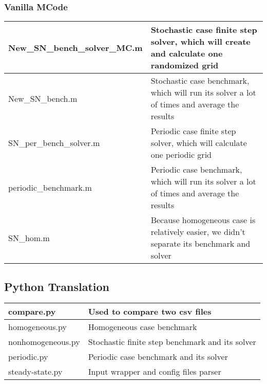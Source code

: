 \documentclass[letter,12pt]{article}
\begin{document}
\subsubsection{Vanilla MCode}
\begin{table}[h]
\centering
\label{my-label}
\begin{tabular}{|l|l|l|}
\hline
New\_SN\_bench\_solver\_MC.m & \multicolumn{2}{p{10cm}|}{Stochastic case finite step solver, which will create and calculate one randomized grid}     \\ \hline
New\_SN\_bench.m             & \multicolumn{2}{p{10cm}|}{\raggedright Stochastic case benchmark, which will run its solver a lot of times and average the results} \\ \hline
SN\_per\_bench\_solver.m     & \multicolumn{2}{p{10cm}|}{\raggedright Periodic case finite step solver, which will calculate one periodic grid}                    \\ \hline
periodic\_benchmark.m        & \multicolumn{2}{p{10cm}|}{\raggedright Periodic case benchmark, which will run its solver a lot of times and average the results}   \\ \hline
SN\_hom.m                    & \multicolumn{2}{p{10cm}|}{\raggedright Because homogeneous case is relatively easier, we didn't separate its benchmark and solver}  \\ \hline
\end{tabular}
\end{table}

\subsection{Python Translation}
\begin{table}[h]
\centering
\label{my-label}
\begin{tabular}{|l|l|l|}
\hline
compare.py        & \multicolumn{2}{p{11.5cm}|}{Used to compare two csv files}                   \\ \hline
homogeneous.py    & \multicolumn{2}{p{11.5cm}|}{\raggedright Homogeneous case benchmark}                      \\ \hline
nonhomogeneous.py & \multicolumn{2}{p{11.5cm}|}{\raggedright Stochastic finite step benchmark and its solver} \\ \hline
periodic.py       & \multicolumn{2}{p{11.5cm}|}{\raggedright Periodic case benchmark and its solver}          \\ \hline
steady-state.py   & \multicolumn{2}{p{11.5cm}|}{\raggedright Input wrapper and config files parser}           \\ \hline
\end{tabular}
\end{table}
\end{document}
